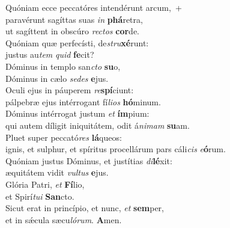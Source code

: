 \evenverse Quóniam ecce peccatóres intendérunt arcum,~+\\\evenverse  paravérunt sagíttas suas \textit{in} \textbf{phá}retra,~\*\\
\evenverse ut sagíttent in obscúro \textit{re}\textit{ctos} \textbf{cor}de.\\
\oddverse Quóniam quæ perfecísti, de\textit{stru}\textbf{xé}runt:~\*\\
\oddverse justus au\textit{tem} \textit{quid} \textbf{fe}cit?\\
\evenverse Dóminus in templo san\textit{cto} \textbf{su}o,~\*\\
\evenverse Dóminus in cælo \textit{se}\textit{des} \textbf{e}jus.\\
\oddverse Oculi ejus in páuperem \textit{re}\textbf{spí}ciunt:~\*\\
\oddverse pálpebræ ejus intérrogant fí\textit{li}\textit{os} \textbf{hó}minum.\\
\evenverse Dóminus intérrogat justum \textit{et} \textbf{ím}pium:~\*\\
\evenverse qui autem díligit iniquitátem, odit á\textit{ni}\textit{mam} \textbf{su}am.\\
\oddverse Pluet super peccató\textit{res} \textbf{lá}queos:~\*\\
\oddverse ignis, et sulphur, et spíritus procellárum pars cáli\textit{cis} \textit{e}\textbf{ó}rum.\\
\evenverse Quóniam justus Dóminus, et justítias \textit{di}\textbf{lé}xit:~\*\\
\evenverse æquitátem vidit \textit{vul}\textit{tus} \textbf{e}jus.\\
\oddverse Glória Patri, \textit{et} \textbf{Fí}lio,~\*\\
\oddverse et Spirí\textit{tu}\textit{i} \textbf{San}cto.\\
\evenverse Sicut erat in princípio, et nunc, \textit{et} \textbf{sem}per,~\*\\
\evenverse et in sǽcula sæcu\textit{ló}\textit{rum}. \textbf{A}men.\\
